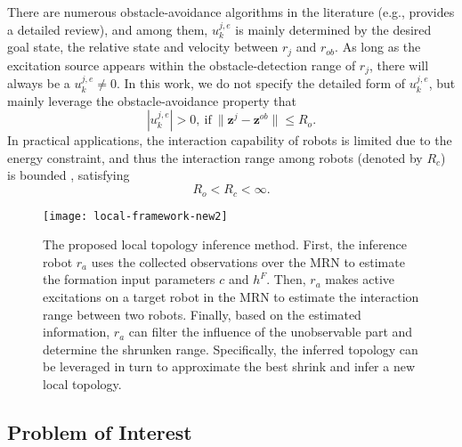 \documentclass[12pt,journal,draftclsnofoot,onecolumn]{IEEEtran}
\let \sss=\scriptscriptstyle
\begin{document}
There are numerous obstacle-avoidance algorithms in the literature (e.g., \cite{pandey2017mobile} provides a detailed review), and among them, $u_{k}^{j,e}$ is mainly determined by the desired goal state, the relative state and velocity between $r_{j}$ and $r_{ob}$. 
As long as the excitation source appears within the obstacle-detection range of $r_j$, there will always be a $u_k^{j,e}\neq0$. 
In this work, we do not specify the detailed form of $u_{k}^{j,e}$, but mainly leverage the obstacle-avoidance property that  
\begin{equation}\label{eq:obstacle-property}
|u_{k}^{j,e}|>0,~\text{if}~\|\mathbf{z}^j-\mathbf{z}^{ob}\|\le R_o. 
\end{equation}
In practical applications, the interaction capability of robots is limited due to the energy constraint, and thus the interaction range among robots (denoted by $R_c$) is bounded \cite{bullo2009distributed}, satisfying 
\begin{equation}\label{eq:interaction-constraint}
R_o<R_c<\infty.
\end{equation}


\begin{figure*}[t]
\centering
\setlength{\abovecaptionskip}{0.1cm}
\texttt{[image: local-framework-new2]}
\caption{The proposed local topology inference method. 
First, the inference robot $r_a$ uses the collected observations over the MRN to estimate the formation input parameters $c$ and $h^{\sss F}$. 
Then, $r_a$ makes active excitations on a target robot in the MRN to estimate the interaction range between two robots. 
Finally, based on the estimated information, $r_a$ can filter the influence of the unobservable part and determine the shrunken range. 
Specifically, the inferred topology can be leveraged in turn to approximate the best shrink and infer a new local topology. 
}
\label{fig:frame}
\end{figure*}



\subsection{Problem of Interest}
\end{document}
